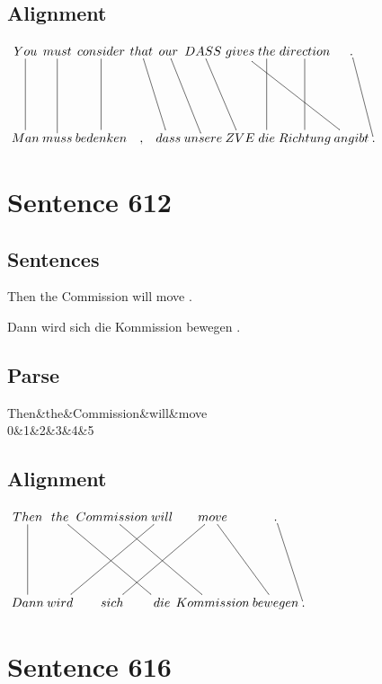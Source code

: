 \documentclass{report}
\begin{document}
\subsection*{Alignment}
\scriptsize{
$
\xymatrix@C-2.3pc{
You \ar @{-} [dd] & must \ar @{-} [dd] & consider \ar @{-} [dd] & that \ar @{-} [ddr] & our \ar @{-} [ddr] & DASS \ar @{-} [ddr] & gives \ar @{-} [ddrrr] & the \ar @{-} [dd] & direction \ar @{-} [dd] & . \ar @{-} [ddr]\\\\
Man & muss & bedenken & , & dass & unsere & ZVE & die & Richtung & angibt & .
}$}
\newpage\section*{Sentence 612}

\subsection*{Sentences}
Then the Commission will move .

\noindent Dann wird sich die Kommission bewegen .



\subsection*{Parse}
\begin{dependency}[theme=simple]
\begin{deptext}[column sep=.5cm, row sep=.1ex]
Then\&the\&Commission\&will\&move\\
0\&1\&2\&3\&4\&5\\
\end{deptext}
\end{dependency}


\subsection*{Alignment}
\scriptsize{
$
\xymatrix@C-2.3pc{
Then \ar @{-} [dd] & the \ar @{-} [ddrr] & Commission \ar @{-} [ddrr] & will \ar @{-} [ddll] & move \ar @{-} [ddr] \ar @{-} [ddll] & . \ar @{-} [ddr]\\\\
Dann & wird & sich & die & Kommission & bewegen & .
}$}
\newpage\section*{Sentence 616}
\end{document}
